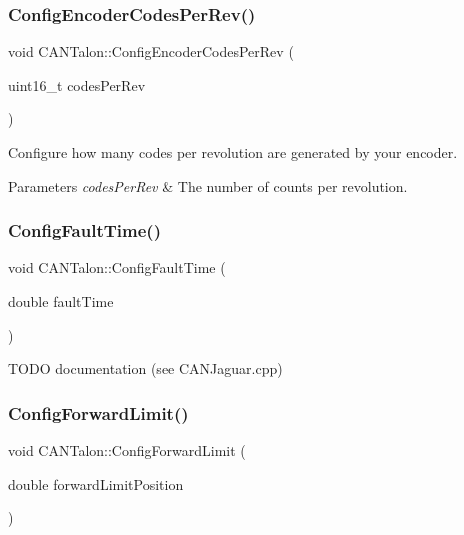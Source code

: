 \subsubsection{\texorpdfstring{Config\+Encoder\+Codes\+Per\+Rev()}{ConfigEncoderCodesPerRev()}}
{\footnotesize\ttfamily void C\+A\+N\+Talon\+::\+Config\+Encoder\+Codes\+Per\+Rev (\begin{DoxyParamCaption}\item[{uint16\+\_\+t}]{codes\+Per\+Rev }\end{DoxyParamCaption})\hspace{0.3cm}{\ttfamily [override]}}

Configure how many codes per revolution are generated by your encoder.


\begin{DoxyParams}{Parameters}
{\em codes\+Per\+Rev} & The number of counts per revolution. \\
\hline
\end{DoxyParams}
\mbox{\label{class_c_a_n_talon_a16100a8dc3b54d7ffc842833cef8f3f1}} 
\subsubsection{\texorpdfstring{Config\+Fault\+Time()}{ConfigFaultTime()}}
{\footnotesize\ttfamily void C\+A\+N\+Talon\+::\+Config\+Fault\+Time (\begin{DoxyParamCaption}\item[{double}]{fault\+Time }\end{DoxyParamCaption})\hspace{0.3cm}{\ttfamily [override]}}

T\+O\+DO documentation (see C\+A\+N\+Jaguar.\+cpp) \mbox{\label{class_c_a_n_talon_a21f11e090b3cd0c04e1bd65a6f3db6ae}} 
\subsubsection{\texorpdfstring{Config\+Forward\+Limit()}{ConfigForwardLimit()}}
{\footnotesize\ttfamily void C\+A\+N\+Talon\+::\+Config\+Forward\+Limit (\begin{DoxyParamCaption}\item[{double}]{forward\+Limit\+Position }\end{DoxyParamCaption})\hspace{0.3cm}{\ttfamily [override]}}

